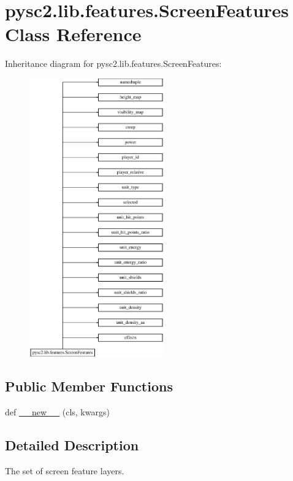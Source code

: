 \hypertarget{classpysc2_1_1lib_1_1features_1_1_screen_features}{}\section{pysc2.\+lib.\+features.\+Screen\+Features Class Reference}
\label{classpysc2_1_1lib_1_1features_1_1_screen_features}
Inheritance diagram for pysc2.\+lib.\+features.\+Screen\+Features\+:\begin{figure}[H]
\begin{center}
\leavevmode
\includegraphics[height=12.000000cm]{classpysc2_1_1lib_1_1features_1_1_screen_features}
\end{center}
\end{figure}
\subsection*{Public Member Functions}
\begin{DoxyCompactItemize}
\item 
def \mbox{\hyperlink{classpysc2_1_1lib_1_1features_1_1_screen_features_a30f47c7db2836974eb515784b1efe33b}{\+\_\+\+\_\+new\+\_\+\+\_\+}} (cls, kwargs)
\end{DoxyCompactItemize}


\subsection{Detailed Description}
\begin{DoxyVerb}The set of screen feature layers.\end{DoxyVerb}
 

